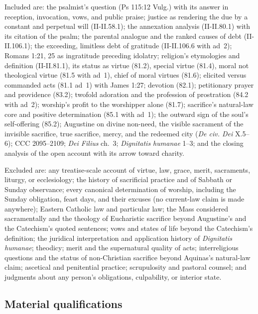 Included are: the psalmist's question (Ps 115:12 Vulg.) with its answer in reception, invocation, vows, and public praise; justice as rendering the due by a constant and perpetual will (II-II.58.1); the annexation analysis (II-II.80.1) with its citation of the psalm; the parental analogue and the ranked causes of debt (II-II.106.1); the exceeding, limitless debt of gratitude (II-II.106.6 with ad~2); Romans 1:21, 25 as ingratitude preceding idolatry; religion's etymologies and definition (II-II.81.1), its status as virtue (81.2), special virtue (81.4), moral not theological virtue (81.5 with ad~1), chief of moral virtues (81.6); elicited versus commanded acts (81.1 ad~1) with James 1:27; devotion (82.1); petitionary prayer and providence (83.2); twofold adoration and the profession of prostration (84.2 with ad~2); worship's profit to the worshipper alone (81.7); sacrifice's natural-law core and positive determination (85.1 with ad~1); the outward sign of the soul's self-offering (85.2); Augustine on divine non-need, the visible sacrament of the invisible sacrifice, true sacrifice, mercy, and the redeemed city (\emph{De civ. Dei} X.5--6); CCC 2095--2109; \emph{Dei Filius} ch.~3; \emph{Dignitatis humanae} 1--3; and the closing analysis of the open account with its arrow toward charity.

Excluded are: any treatise-scale account of virtue, law, grace, merit, sacraments, liturgy, or ecclesiology; the history of sacrificial practice and of Sabbath or Sunday observance; every canonical determination of worship, including the Sunday obligation, feast days, and their excuses (no current-law claim is made anywhere); Eastern Catholic law and particular law; the Mass considered sacramentally and the theology of Eucharistic sacrifice beyond Augustine's and the Catechism's quoted sentences; vows and states of life beyond the Catechism's definition; the juridical interpretation and application history of \emph{Dignitatis humanae}; theodicy; merit and the supernatural quality of acts; interreligious questions and the status of non-Christian sacrifice beyond Aquinas's natural-law claim; ascetical and penitential practice; scrupulosity and pastoral counsel; and judgments about any person's obligations, culpability, or interior state.

\subsection{Material qualifications}

